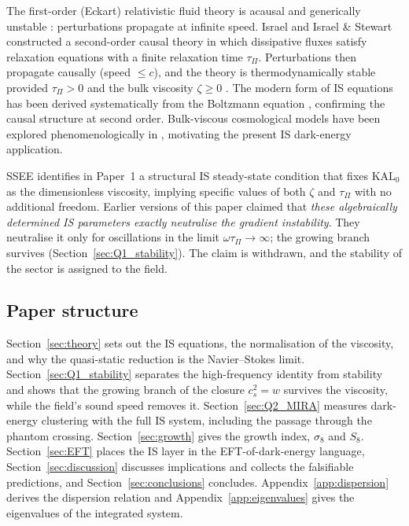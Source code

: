\documentclass[12pt,a4paper]{article}
\newcommand{\KALz}{\mathrm{KAL}_0}
\newcommand{\tauPi}{\tau_\Pi}
\begin{document}
The first-order (Eckart) relativistic fluid theory \citep{Eckart1940} is acausal
\citep{Muller1967} and generically unstable \citep{HiscockLindblom1985}: perturbations propagate at
infinite speed.
Israel \citep{Israel1976} and Israel \& Stewart \citep{IsraelStewart1979}
constructed a second-order causal theory in which dissipative fluxes satisfy
relaxation equations with a finite relaxation time $\tauPi$.
Perturbations then propagate causally (speed $\leq c$), and the theory is
thermodynamically stable provided $\tauPi > 0$ and the bulk viscosity $\zeta \geq 0$
\citep{HiscockLindblom1983}.
The modern form of IS equations has been derived systematically from the Boltzmann
equation \citep{Denicol2012}, confirming the causal structure at second order.
Bulk-viscous cosmological models have been explored phenomenologically in
\citet{BrevikGron2013}, motivating the present IS dark-energy application.

SSEE identifies in Paper~1 a structural IS steady-state condition that fixes
$\KALz$ as the dimensionless viscosity, implying specific values of both $\zeta$
and $\tauPi$ with no additional freedom.
Earlier versions of this paper claimed that \emph{these algebraically determined
IS parameters exactly neutralise the gradient instability}. They neutralise it only
for oscillations in the limit $\omega\tauPi\to\infty$; the growing branch survives
(Section~\ref{sec:Q1_stability}). The claim is withdrawn, and the stability of
the sector is assigned to the field.

\subsection{Paper structure}
\label{subsec:outline}

Section~\ref{sec:theory} sets out the IS equations, the normalisation of the
viscosity, and why the quasi-static reduction is the Navier--Stokes limit.
Section~\ref{sec:Q1_stability} separates the high-frequency identity from stability
and shows that the growing branch of the closure $c^2_s=w$ survives the viscosity,
while the field's sound speed removes it. Section~\ref{sec:Q2_MIRA} measures
dark-energy clustering with the full IS system, including the passage through the
phantom crossing. Section~\ref{sec:growth} gives the growth index, $\sigma_8$ and $S_8$.
Section~\ref{sec:EFT} places the IS layer in the EFT-of-dark-energy language,
Section~\ref{sec:discussion} discusses implications and collects the falsifiable
predictions, and Section~\ref{sec:conclusions} concludes. Appendix~\ref{app:dispersion}
derives the dispersion relation and Appendix~\ref{app:eigenvalues} gives the
eigenvalues of the integrated system.
\end{document}
